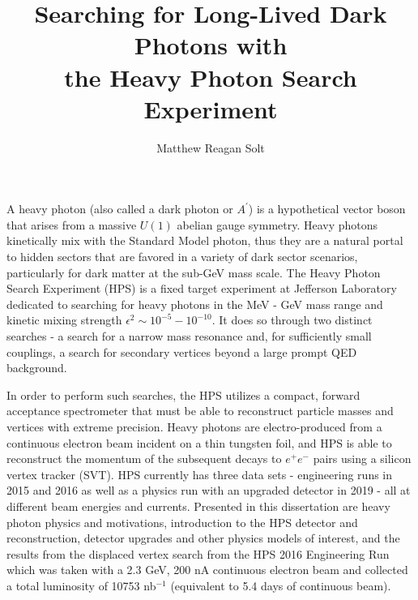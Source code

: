 \documentclass{report}
\newcommand{\posi}{e^{+}}
\newcommand{\ele}{e^{-}}
\newcommand{\epem}{\posi\ele}
\newcommand{\aprime}{A^\prime}
\begin{document}
\title{Searching for Long-Lived Dark Photons with\\
            the Heavy Photon Search Experiment}
\author{Matthew Reagan Solt}
 
\beforepreface
{}

A heavy photon (also called a dark photon or $\aprime$) is a hypothetical vector boson that arises from a massive $U(1)$ abelian gauge symmetry. Heavy photons kinetically mix with the Standard Model photon, thus they are a natural portal to hidden sectors that are favored in a variety of dark sector scenarios, particularly for dark matter at the sub-GeV mass scale. The Heavy Photon Search Experiment (HPS) is a fixed target experiment at Jefferson Laboratory dedicated to searching for heavy photons in the MeV - GeV mass range and kinetic mixing strength $\epsilon^2 \sim 10^{-5}-10^{-10}$. It does so through two distinct searches - a search for a narrow mass resonance and, for sufficiently small couplings, a search for secondary vertices beyond a large prompt QED background.

In order to perform such searches, the HPS utilizes a compact, forward acceptance spectrometer that must be able to reconstruct particle masses and vertices with extreme precision. Heavy photons are electro-produced from a continuous electron beam incident on a thin tungsten foil, and HPS is able to reconstruct the momentum of the subsequent decays to $\epem$ pairs using a silicon vertex tracker (SVT). HPS currently has three data sets - engineering runs in 2015 and 2016 as well as a physics run with an upgraded detector in 2019 - all at different beam energies and currents. Presented in this dissertation are heavy photon physics and motivations, introduction to the HPS detector and reconstruction, detector upgrades and other physics models of interest, and the results from the displaced vertex search from the HPS 2016 Engineering Run which was taken with a 2.3 GeV, 200 nA continuous electron beam and collected a total luminosity of 10753 nb$^{-1}$ (equivalent to 5.4 days of continuous beam). 
\end{document}
